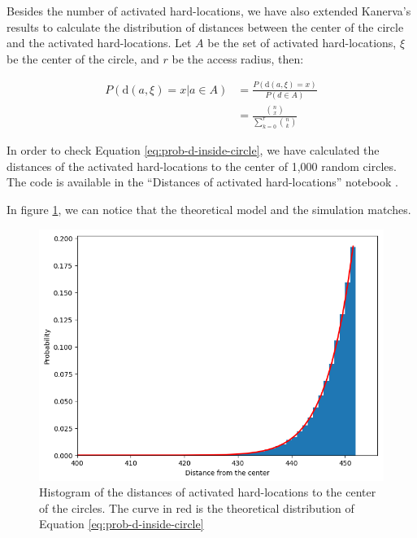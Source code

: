 Besides the number of activated hard-locations, we have also extended Kanerva's results to calculate the distribution of distances between the center of the circle and the activated hard-locations. Let $A$ be the set of activated hard-locations, $\xi$ be the center of the circle, and $r$ be the access radius, then:

\begin{align}
P(\text{d}(a, \xi)=x | a \in A) &= \frac{P(\text{d}(a, \xi)=x)}{P(d \in A)} \\
    &= \frac{\binom{n}{x}}{\sum_{k=0}^r \binom{n}{k}} \label{eq:prob-d-inside-circle}
\end{align}

In order to check Equation \ref{eq:prob-d-inside-circle}, we have calculated the distances of the activated hard-locations to the center of 1,000 random circles. The code is available in the ``Distances of activated hard-locations'' notebook \citep{sdmframework}.

In figure \ref{fig:validation-distance-activated-hls}, we can notice that the theoretical model and the simulation matches.

\begin{figure}[!htb]
\centering\includegraphics[width=\textwidth]{./images02/new-images/distance-activated-hls.png}

\caption{Histogram of the distances of activated hard-locations to the center of the circles. The curve in red is the theoretical distribution of Equation \ref{eq:prob-d-inside-circle}
\label{fig:validation-distance-activated-hls}}
\end{figure}


